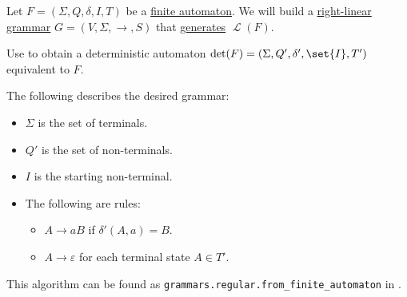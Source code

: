\begin{algorithm}\label{alg:right_linear_grammar_from_finite_automaton}
  Let \( F = (\Sigma, Q, \delta, I, T) \) be a \hyperref[def:finite_automaton]{finite automaton}. We will build a \hyperref[def:chomsky_hierarchy/regular]{right-linear grammar} \( G = (V, \Sigma, \to, S) \) that \hyperref[def:formal_grammar/language]{generates} \( \mscrL(F) \).

  \begin{thmenum}
     Use  to obtain a deterministic automaton \( \det(F) = (\Sigma, Q', \delta', \set{ I }, T') \) equivalent to \( F \).

     The following describes the desired grammar:
    \begin{itemize}
      \item \( \Sigma \) is the set of terminals.
      \item \( Q' \) is the set of non-terminals.
      \item \( I \) is the starting non-terminal.
      \item The following are rules:
      \begin{itemize}
        \item \( A \to aB \) if \( \delta'(A, a) = B \).
        \item \( A \to \varepsilon \) for each terminal state \( A \in T' \).
      \end{itemize}
    \end{itemize}
  \end{thmenum}
\end{algorithm}
\begin{comments}
  \item This algorithm can be found as \texttt{grammars.regular.from\_finite\_automaton} in \cite{code}.
\end{comments}

